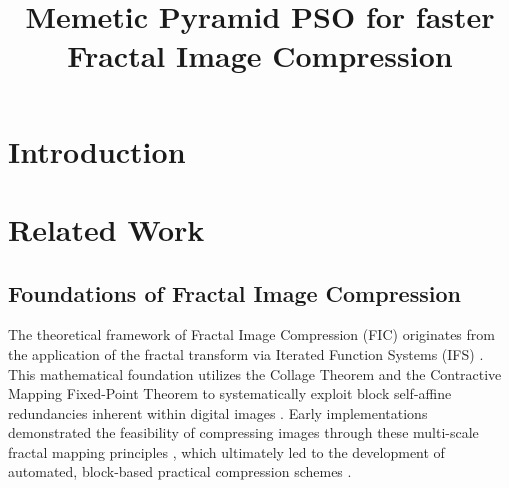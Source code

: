 \documentclass[conference]{IEEEtran}
\begin{document}
\title{Memetic Pyramid PSO for faster Fractal Image Compression\\
}

\author{
    \and
    \and
}

\maketitle

\begin{abstract}
\end{abstract}

\begin{IEEEkeywords}
\end{IEEEkeywords}

\section{Introduction}
\section{Related Work}

\subsection{Foundations of Fractal Image Compression}
The theoretical framework of Fractal Image Compression (FIC) originates from the application of the fractal transform via Iterated Function Systems (IFS) \cite{Barnsley1985}. This mathematical foundation utilizes the Collage Theorem and the Contractive Mapping Fixed-Point Theorem to systematically exploit block self-affine redundancies inherent within digital images \cite{barnsley2014fractals, Barnsley1985}. Early implementations demonstrated the feasibility of compressing images through these multi-scale fractal mapping principles \cite{barnsley1988better}, which ultimately led to the development of automated, block-based practical compression schemes \cite{FICOriginal}.
\end{document}
